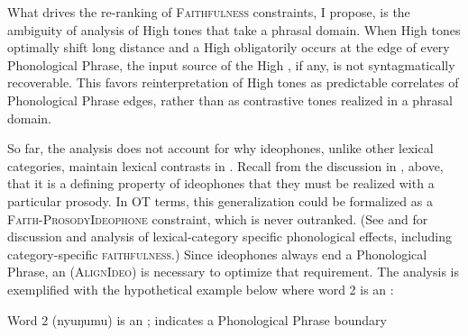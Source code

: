 \documentclass[output=paper
,newtxmath
,modfonts
,nonflat]{../langsci/langscibook}
\begin{document}
What drives the re-ranking of \textsc{Faithfulness} constraints, I propose, is the ambiguity of analysis of High tones that take a phrasal domain. When High tones optimally shift long distance and a High  obligatorily occurs at the edge of every Phonological Phrase, the input source of the High , if any, is not syntagmatically recoverable. This favors reinterpretation of High tones as predictable correlates of Phonological Phrase edges, rather than as contrastive tones realized in a phrasal domain.

So far, the analysis does not account for why ideophones, unlike other lexical categories, maintain lexical  contrasts in . Recall from the discussion in , above, that it is a defining property of ideophones that they must be realized with a particular prosody. In OT terms, this generalization could be formalized as a \textsc{Faith-ProsodyIdeophone} constraint, which is never outranked. (See \citealt{Shih&Inkelas2015} and \citealt{Smith2011} for discussion and analysis of lexical-category specific phonological effects, including category-specific \textsc{faithfulness}.) Since ideophones always end a Phonological Phrase, an  (\textsc{AlignIdeo}) is necessary to optimize that requirement. The analysis is exemplified with the hypothetical example below where word 2 is an :


\ea\label{ex:downing:25}  Word 2 (nyuŋumu) is an ; {\textbar} indicates a Phonological   Phrase boundary
\z
\end{document}
